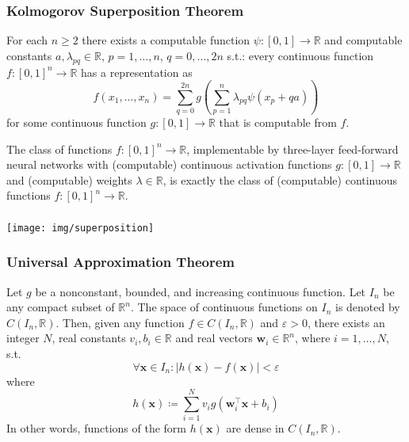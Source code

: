 \documentclass[UTF8,11pt,colorlinks,compress,openany]{beamer}%
\begin{document}
\begin{frame}\frametitle{Kolmogorov Superposition Theorem}
	\begin{theorem}
		For each $n\geq 2$ there exists a computable function $\psi: [0, 1]\to\mathbb{R}$ and computable constants $a,\lambda_{pq}\in\mathbb{R}$, $p=1,\dots,n$, $q=0,\dots,2n$ s.t.: every continuous function $f: [0,1]^n\to\mathbb{R}$ has a representation as
		\[f(x_1,\dots,x_n)=\sum\limits_{q=0}^{2n} g\left(\sum\limits_{p=1}^n\lambda_{pq}\psi(x_p+qa)\right)\]
		for some continuous function $g:[0,1]\to\mathbb{R}$ that is computable from $f$.
	\end{theorem}
	\begin{theorem}
		The class of functions $f: [0, 1]^n\to\mathbb{R}$, implementable by three-layer feed-forward neural networks with (computable) continuous activation functions $g: [0, 1]\to\mathbb{R}$ and (computable) weights $\lambda\in\mathbb{R}$, is exactly the class of (computable) continuous functions $f:[0,1]^n\to\mathbb{R}$.
	\end{theorem}
\end{frame}

\begin{frame}\frametitle{}
	\centering \texttt{[image: img/superposition]}
\end{frame}

\begin{frame}\frametitle{Universal Approximation Theorem}
	\begin{theorem}
		Let $g$ be a nonconstant, bounded, and increasing continuous function. Let $I_n$ be any compact subset of $\mathbb{R}^n$. The space of continuous functions on $I_n$ is denoted by $C(I_n,\mathbb{R})$. Then, given any function $f\in C(I_n,\mathbb{R})$ and $\varepsilon>0$, there exists an integer $N$, real constants $v_i,b_i\in\mathbb{R}$ and real vectors $\mathbf{w}_i \in \mathbb{R}^n$, where $i=1,\dots,N$, s.t.
		\[\forall\mathbf{x}\in I_n: |h(\mathbf{x}) - f(\mathbf{x})| < \varepsilon\]
		where
		\[h(\mathbf{x})\coloneqq \sum\limits_{i=1}^{N} v_i g\left(\mathbf{w}_i^\top\mathbf{x} + b_i\right)\]
		In other words, functions of the form $h(\mathbf{x})$ are dense in $C(I_n,\mathbb{R})$.
	\end{theorem}
\end{frame}
\end{document}
